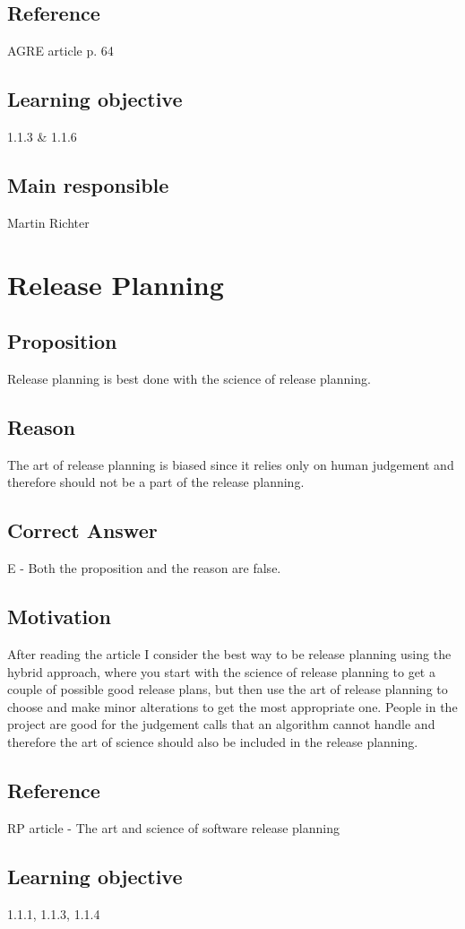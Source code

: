 \documentclass[a4paper]{article}
\begin{document}
\subsection*{Reference}
AGRE article p. 64
\subsection*{Learning objective}
1.1.3 \& 1.1.6
\subsection*{Main responsible}
Martin Richter

\section{Release Planning}
\subsection*{Proposition}
Release planning is best done with the science of release planning.
\subsection*{Reason}
The art of release planning is biased since it relies only on human judgement and therefore should not be a part of the release planning.
\subsection*{Correct Answer}
E - Both the proposition and the reason are false.
\subsection*{Motivation}
After reading the article I consider the best way to be release planning using the hybrid approach, where you start with the science of release planning to get a couple of possible good release plans, but then use the art of release planning to choose and make minor alterations to get the most appropriate one. People in the project are good for the judgement calls that an algorithm cannot handle and therefore the art of science should also be included in the release planning. 
\subsection*{Reference}
RP article - The art and science of software release planning
\subsection*{Learning objective}
1.1.1, 1.1.3, 1.1.4
\end{document}
